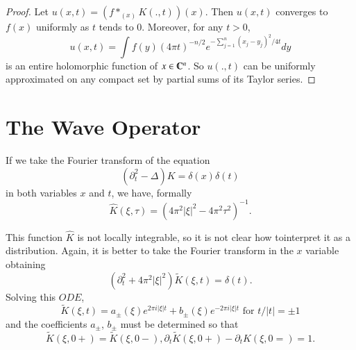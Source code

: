 \begin{proof}
Let $u (x,t) = (f *_{(x)} K (., t)) (x)$. Then $u(x,t)$ converges to
$f(x)$ uniformly as $t$ tends to 0. Moreover, for any $t > 0$, 
 $$
 u(x,t) = \int f(y) (4 \pi t)^{-n/2} e^{-\sum\limits^n_{j=1} (x_j -y_j)^2 /4t} dy
 $$
is an entire holomorphic function of $x  \in \varmathbb{C}^n$. So
$u(.,t)$ can be uniformly approximated on any compact set by partial
sums of its Taylor series. 
\end{proof}

\section{The Wave Operator}\label{chap2:sec6}%

If we take the Fourier transform of the equation 
$$
(\partial^2_t - \Delta) K = \delta(x) \delta(t) 
$$
in both variables $x$ and $t$, we have, formally 
\begin{equation}
  \hat{K}(\xi, \tau) = (4 \pi^2 | \xi |^2 - 4 \pi^2
  \tau^2)^{-1}. \tag{2.36}\label{chap2:sec6:eq2.36} 
\end{equation} 

This function $\hat{K}$ is not locally integrable, so it is not clear
how to\pageoriginale interpret it as a distribution. Again, it is better to take the
Fourier transform in the $x$ variable obtaining 
$$
(\partial^2_t + 4 \pi^2 |\xi|^2) \tilde{K}(\xi, t ) = \delta(t).
$$ 
Solving this $ODE$,
$$
\tilde{K}(\xi, t ) = a_\pm (\xi) e^{2 \pi i|\xi|t} + b_\pm (\xi)
e^{-2 \pi i|\xi|t} \text{ for } t / |t|= \pm 1 
$$
and the coefficients $a_\pm$, $b_\pm$ must be determined so that
$$
\tilde{K}(\xi, 0 +) = \tilde{K}(\xi, 0 -), \partial_t \tilde{K}(\xi, 0
+) - \partial_t K(\xi, 0 = ) =1. 
$$

